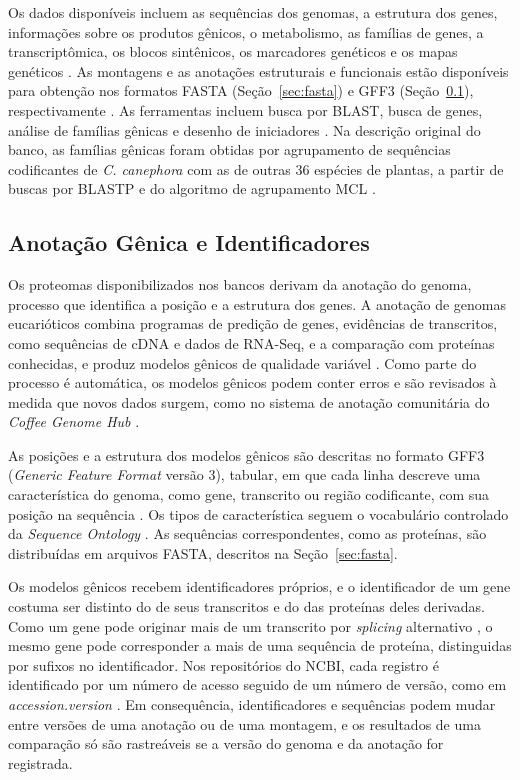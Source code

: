 Os dados disponíveis incluem as sequências dos genomas, a estrutura dos genes, informações sobre os produtos gênicos, o metabolismo, as famílias de genes, a transcriptômica, os blocos sintênicos, os marcadores genéticos e os mapas genéticos \cite{Dereeper2015}. As montagens e as anotações estruturais e funcionais estão disponíveis para obtenção nos formatos FASTA (Seção~\ref{sec:fasta}) e GFF3 (Seção~\ref{subsec:anotacao}), respectivamente \cite{Dereeper2015}. As ferramentas incluem busca por BLAST, busca de genes, análise de famílias gênicas e desenho de iniciadores \cite{CoffeeHub}. Na descrição original do banco, as famílias gênicas foram obtidas por agrupamento de sequências codificantes de \textit{C. canephora} com as de outras 36 espécies de plantas, a partir de buscas por BLASTP e do algoritmo de agrupamento MCL \cite{Dereeper2015}.

\subsection{Anotação Gênica e Identificadores}
\label{subsec:anotacao}

Os proteomas disponibilizados nos bancos derivam da anotação do genoma, processo que identifica a posição e a estrutura dos genes. A anotação de genomas eucarióticos combina programas de predição de genes, evidências de transcritos, como sequências de cDNA e dados de RNA-Seq, e a comparação com proteínas conhecidas, e produz modelos gênicos de qualidade variável \cite{Yandell2012}. Como parte do processo é automática, os modelos gênicos podem conter erros e são revisados à medida que novos dados surgem, como no sistema de anotação comunitária do \textit{Coffee Genome Hub} \cite{Dereeper2015, Yandell2012}.

As posições e a estrutura dos modelos gênicos são descritas no formato GFF3 (\textit{Generic Feature Format} versão 3), tabular, em que cada linha descreve uma característica do genoma, como gene, transcrito ou região codificante, com sua posição na sequência \cite{Dereeper2015}. Os tipos de característica seguem o vocabulário controlado da \textit{Sequence Ontology} \cite{Eilbeck2005}. As sequências correspondentes, como as proteínas, são distribuídas em arquivos FASTA, descritos na Seção~\ref{sec:fasta}.

Os modelos gênicos recebem identificadores próprios, e o identificador de um gene costuma ser distinto do de seus transcritos e do das proteínas deles derivadas. Como um gene pode originar mais de um transcrito por \textit{splicing} alternativo \cite{Alberts2017}, o mesmo gene pode corresponder a mais de uma sequência de proteína, distinguidas por sufixos no identificador. Nos repositórios do NCBI, cada registro é identificado por um número de acesso seguido de um número de versão, como em \textit{accession.version} \cite{NCBIAssembly}. Em consequência, identificadores e sequências podem mudar entre versões de uma anotação ou de uma montagem, e os resultados de uma comparação só são rastreáveis se a versão do genoma e da anotação for registrada.

